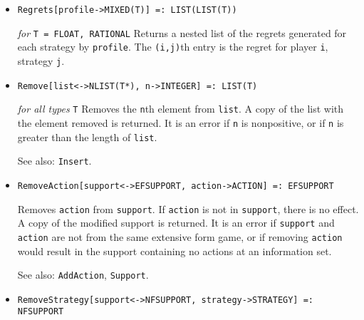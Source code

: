 \begin{itemize}
{\it for} {\tt T = FLOAT, RATIONAL}
\bd
Returns the gain to a player for deviating to \verb+strategy+, assuming
all players are following \verb+profile+.  The strategy profile is
a Nash equilibrium if and only if the regrets of all strategies are
identically zero.
\ed

\item{}
\protect \large \begin{verbatim}
Regrets[profile->MIXED(T)] =: LIST(LIST(T))
\end{verbatim} \normalsize

{\it for} {\tt T = FLOAT, RATIONAL}
\bd
Returns a nested list of the regrets generated for each strategy by
\verb+profile+.  The \verb+(i,j)+th entry is the regret for player
\verb+i+, strategy \verb+j+.
\ed

\item{}
\protect \large \begin{verbatim}
Remove[list<->NLIST(T*), n->INTEGER] =: LIST(T)
\end{verbatim}\normalsize

{\it for all types} {\tt T}
\bd
Removes the \verb+n+th element from \verb+list+.  A copy of the list
with the element removed is returned.  It is an error if \verb+n+
is nonpositive, or if \verb+n+ is greater than the length of \verb+list+.
\item [See also:] \verb+Insert+.
\ed

\item{}
\protect \large \begin{verbatim}
RemoveAction[support<->EFSUPPORT, action->ACTION] =: EFSUPPORT
\end{verbatim}\normalsize

\bd
Removes \verb+action+ from \verb+support+.  If \verb+action+ is
not in \verb+support+, there is no effect.  A copy of the modified
support is returned.  It is an error if \verb+support+ and \verb+action+
are not from the same extensive form game, or if removing \verb+action+
would result in the support containing no actions at an information set.
\item [See also:] \verb+AddAction+, \verb+Support+.
\ed

\item{}
\protect \large \begin{verbatim}
RemoveStrategy[support<->NFSUPPORT, strategy->STRATEGY] =: NFSUPPORT
\end{verbatim}\normalsize


\end{itemize}
